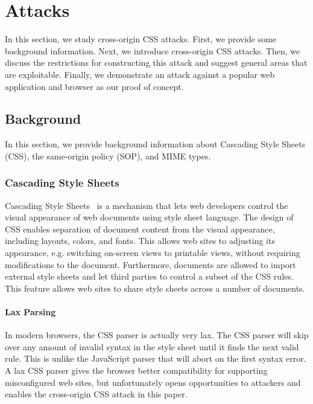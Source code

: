 \documentclass{acm_proc_article-sp}
\begin{document}
\section{Attacks} \label{sec:attacks}
In this section, we study cross-origin CSS attacks. First, we provide some background information. Next, we introduce cross-origin CSS attacks. Then, we discuss the restrictions for constructing this attack and suggest general areas that are exploitable. Finally, we demonstrate an attack against a popular web application and browser as our proof of concept.

\subsection{Background}
In this section, we provide background information about Cascading Style Sheets (CSS), the same-origin policy (SOP), and MIME types.

\subsubsection{Cascading Style Sheets}
Cascading Style Sheets~\cite{css} is a mechanism that lets web developers control the visual appearance of web documents using style sheet language. The design of CSS enables separation of document content from the visual appearance, including layouts, colors, and fonts. This allows web sites to adjusting its appearance, e.g. switching on-screen views to printable views, without requiring modifications to the document. Furthermore, documents are allowed to import external style sheets and let third parties to control a subset of the CSS rules. This feature allows web sites to share style sheets across a number of documents.

\paragraph{Lax Parsing}
In modern browsers, the CSS parser is actually very lax. The CSS parser will skip over any amount of invalid syntax in the style sheet until it finds the next valid rule. This is unlike the JavaScript parser that will abort on the first syntax error. A lax CSS parser gives the browser better compatibility for supporting misconfigured web sites, but unfortunately opens opportunities to attackers and enables the cross-origin CSS attack in this paper.

\end{document}
